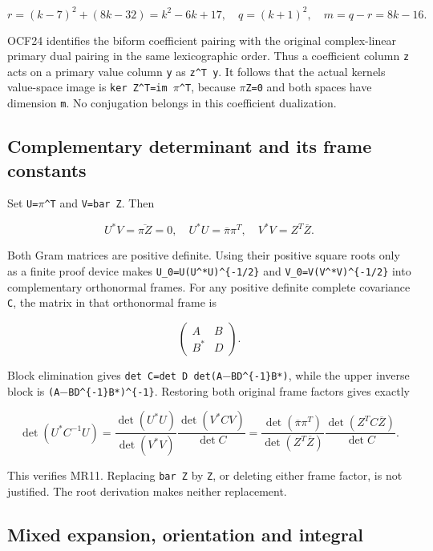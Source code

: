 \documentclass[11pt]{article}
\begin{document}
\[
r=(k-7)^2+(8k-32)=k^2-6k+17,
\quad q=(k+1)^2,
\quad m=q-r=8k-16.
\]

OCF24 identifies the biform coefficient pairing with the original complex-linear primary dual pairing in the same lexicographic order. Thus a coefficient column \texttt{z} acts on a primary value column \texttt{y} as \texttt{z\^{}T\ y}. It follows that the actual kernel\textquotesingle s value-space image is \texttt{ker\ Z\^{}T=im\ \ensuremath{\pi}\^{}T}, because \texttt{\ensuremath{\pi}Z=0} and both spaces have dimension \texttt{m}. No conjugation belongs in this coefficient dualization.

\subsection{Complementary determinant and its frame constants}\label{mrreview:complementary-determinant-and-its-frame-constants}

Set \texttt{U=\ensuremath{\pi}\^{}T} and \texttt{V=bar\ Z}. Then

\[
U^*V=\overline{\pi Z}=0,
\quad U^*U=\overline\pi\pi^T,
\quad V^*V=Z^T\overline Z.
\]

Both Gram matrices are positive definite. Using their positive square roots only as a finite proof device makes \texttt{U\_0=U(U\^{}*U)\^{}\{-1/2\}} and \texttt{V\_0=V(V\^{}*V)\^{}\{-1/2\}} into complementary orthonormal frames. For any positive definite complete covariance \texttt{C}, the matrix in that orthonormal frame is

\[
\begin{pmatrix}A&B\\B^*&D\end{pmatrix}.
\]

Block elimination gives \texttt{det\ C=det\ D\ det(A\ensuremath{-}BD\^{}\{-1\}B*)}, while the upper inverse block is \texttt{(A\ensuremath{-}BD\^{}\{-1\}B*)\^{}\{-1\}}. Restoring both original frame factors gives exactly

\[
\det(U^*C^{-1}U)
=\frac{\det(U^*U)}{\det(V^*V)}
  \frac{\det(V^*CV)}{\det C}
=\frac{\det(\overline\pi\pi^T)}{\det(Z^T\overline Z)}
  \frac{\det(Z^TC\overline Z)}{\det C}.
\]

This verifies MR11. Replacing \texttt{bar\ Z} by \texttt{Z}, or deleting either frame factor, is not justified. The root derivation makes neither replacement.

\subsection{Mixed expansion, orientation and integral}\label{mrreview:mixed-expansion-orientation-and-integral}
\end{document}
